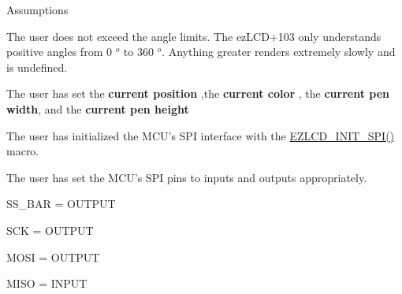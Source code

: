 \begin{DoxyParagraph}{Assumptions}

\begin{DoxyItemize}
\item The user does not exceed the angle limits. The ez\-L\-C\-D+103 only understands positive angles from 0 $^o$ to 360 $^o$. Anything greater renders extremely slowly and is undefined.
\item The user has set the {\bfseries current position },the {\bfseries current color }, the {\bfseries current pen width}, and the {\bfseries current pen height}
\item The user has initialized the M\-C\-U's S\-P\-I interface with the \hyperlink{group__ez_l_c_d__103__common_gaf5c3b2dedc950d34e0381946fbb32428}{E\-Z\-L\-C\-D\-\_\-\-I\-N\-I\-T\-\_\-\-S\-P\-I()} macro.
\item The user has set the M\-C\-U's S\-P\-I pins to inputs and outputs appropriately. \par
\par

\begin{DoxyItemize}
\item S\-S\-\_\-\-B\-A\-R = O\-U\-T\-P\-U\-T
\item S\-C\-K = O\-U\-T\-P\-U\-T
\item M\-O\-S\-I = O\-U\-T\-P\-U\-T
\item M\-I\-S\-O = I\-N\-P\-U\-T 
\end{DoxyItemize}
\end{DoxyItemize}
\end{DoxyParagraph}
